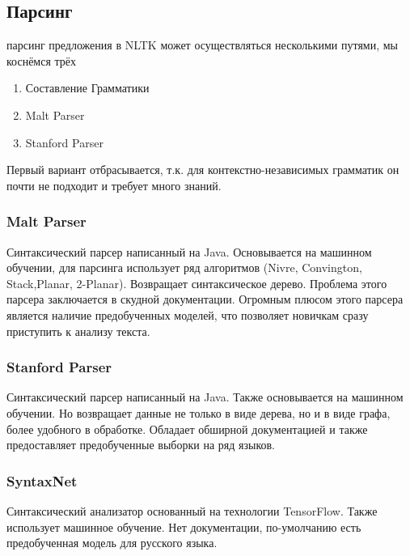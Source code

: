 \subsection{Парсинг}
парсинг предложения в NLTK может осуществляться несколькими путями, мы коснёмся трёх
\begin{enumerate}
\item Составление Грамматики
\item Malt Parser
\item Stanford Parser
\end{enumerate}
Первый вариант отбрасывается, т.к. для контекстно-независимых грамматик он почти не подходит и требует много знаний.
\subsubsection{Malt Parser}
Синтаксический парсер написанный на Java. Основывается на машинном обучении, для парсинга использует ряд алгоритмов (Nivre, Convington, Stack,Planar, 2-Planar). Возвращает синтаксическое дерево. Проблема этого парсера заключается в скудной документации. Огромным плюсом этого парсера является наличие предобученных моделей, что позволяет новичкам сразу приступить к анализу текста.
\subsubsection{Stanford Parser}
 Синтаксический парсер написанный на Java. Также основывается на машинном обучении. Но возвращает данные не только в виде дерева, но и в виде графа, более удобного в обработке. Обладает обширной документацией и также предоставляет предобученные выборки на ряд языков. 
 \subsubsection{SyntaxNet}
 Синтаксический анализатор основанный на технологии TensorFlow. Также использует машинное обучение. Нет документации, по-умолчанию есть предобученная модель для русского языка.
